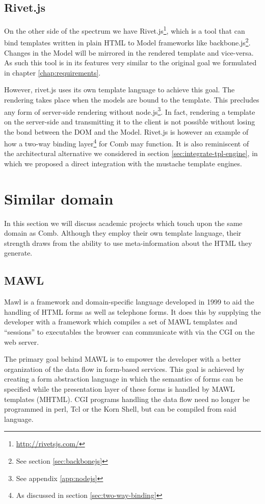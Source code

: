 \documentclass[thesis.tex]{subfiles}
\begin{document}
\subsection{Rivet.js}
On the other side of the spectrum we have
Rivet.js\footnote{\url{http://rivetsjs.com/}}, which is a tool that
can bind templates written in plain HTML to Model frameworks like
backbone.js\footnote{See section \ref{sec:backbonejs}}.
Changes in the Model will be mirrored in the rendered template and vice-versa.
As such this tool is in its features very similar to the original goal we
formulated in chapter \ref{chap:requirements}.

However, rivet.js uses its own template language to achieve this goal.
The rendering takes place when the models are bound to the template.
This precludes any form of server-side rendering without
node.js\footnote{See appendix \ref{app:nodejs}}.
In fact, rendering a template on the server-side and transmitting it to the
client is not possible without losing the bond between the DOM and the Model.
Rivet.js is however an example of how a two-way binding
layer\footnote{As discussed in section \ref{sec:two-way-binding}}
for Comb may function. It is also reminiscent of the architectural alternative
we considered in section \ref{sec:integrate-tpl-engine}, in which we proposed a
direct integration with the mustache template engines.



\section{Similar domain}
In this section we will discuss academic projects which touch upon the same
domain as Comb.
Although they employ their own template language, their strength draws from
the ability to use meta-information about the HTML they generate.

\subsection{MAWL}
Mawl\cite{MAWL} is a framework and domain-specific language developed in 1999
to aid the handling of HTML forms as well as telephone forms.
It does this by supplying the developer with a framework which compiles
a set of MAWL templates and ``sessions'' to executables
the browser can communicate with via the CGI on the web server.

The primary goal behind MAWL is to empower the developer with a better
organization of the data flow in form-based services.
This goal is achieved by creating a form abstraction language in which the
semantics of forms can be specified while the presentation layer of these forms
is handled by MAWL templates (MHTML).
CGI programs handling the data flow need no longer be programmed in
perl, Tcl or the Korn Shell, but can be compiled from said language.
\end{document}
